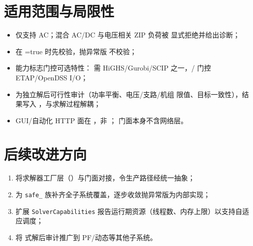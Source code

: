 \documentclass[UTF8,fontset=fandol,a4paper,11pt]{ctexart}
\begin{document}
\section{适用范围与局限性}
\begin{itemize}
  \item {} 仅支持 AC；混合 AC/DC 与电压相关 ZIP 负荷被
        显式拒绝并给出诊断；
  \item {} 在 =true 时先校验，抛异常版
         不校验；
  \item 能力标志门控可选特性： 需 HiGHS/Gurobi/SCIP
        之一，/ 门控 ETAP/OpenDSS I/O；
  \item {} 为独立解后可行性审计（功率平衡、电压/支路/机组
        限值、目标一致性），结果写入 ，与求解过程解耦；
  \item GUI/自动化 HTTP 面在 ，非 ；
        门面本身不含网络层。
\end{itemize}

\section{后续改进方向}
\begin{enumerate}
  \item 将求解器工厂层（）与门面对接，令生产路径经统一抽象；
  \item 为 \texttt{safe\_} 族补齐全子系统覆盖，逐步收敛抛异常版为内部实现；
  \item 扩展 \texttt{SolverCapabilities} 报告运行期资源（线程数、内存上限）以支持自适应调度；
  \item 将  式解后审计推广到 PF/动态等其他子系统。
\end{enumerate}




\end{document}
